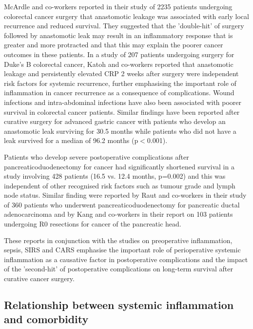McArdle and co-workers reported in their study of 2235 patients undergoing colorectal cancer surgery that anastomotic leakage was associated with early local recurrence and reduced survival. They suggested that the 'double-hit' of surgery followed by anastomotic leak may result in an inflammatory response that is greater and more protracted and that this may explain the poorer cancer outcomes in these patients.\parencite{mcardle_impact_2005} In a study of 207 patients undergoing surgery for Duke's B colorectal cancer, Katoh and co-workers reported that anastomotic leakage and persistently elevated CRP 2 weeks after surgery were independent risk factors for systemic recurrence, further emphasising the important role of inflammation in cancer recurrence as a consequence of complications.\parencite{katoh_anastomotic_2011} Wound infections and intra-abdominal infections have also been associated with poorer survival in colorectal cancer patients.\parencite{nespoli_impact_2006} Similar findings have been reported after curative surgery for advanced gastric cancer with patients who develop an anastomotic leak surviving for 30.5 months while patients who did not have a leak survived for a median of 96.2 months (p$<$0.001). \parencite{yoo_negative_2011} 

Patients who develop severe postoperative complications after pancreaticoduodenectomy for cancer had significantly shortened survival in a study involving 428 patients (16.5 vs. 12.4 months, p=0.002) and this was independent of other recognised risk factors such as tumour grade and lymph node status. \parencite{kamphues_postoperative_2012} Similar finding were reported by Raut and co-workers in their study of 360 patients who underwent pancreaticoduodenectomy for pancreatic ductal adenocarcinoma \parencite{raut_impact_2007} and by Kang and co-workers in their report on 103 patients undergoing R0 resections for cancer of the pancreatic head. \parencite{kang_detrimental_2009}

These reports in conjunction with the studies on preoperative inflammation, sepsis, SIRS and CARS emphasise the important role of perioperative systemic inflammation as a causative factor in postoperative complications and the impact of the 'second-hit' of postoperative complications on long-term survival after curative cancer surgery.

\subsection{Relationship between systemic inflammation and comorbidity}

